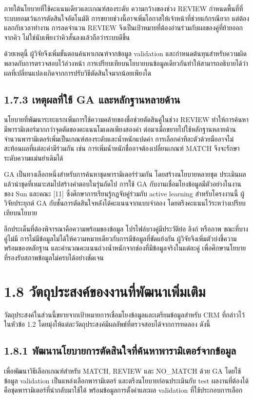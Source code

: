 ภายใต้นโยบายที่ใช้คะแนนเดียวและเกณฑ์สองระดับ ความกว้างของช่วง REVIEW กำหนดพื้นที่ที่ระบบยอมเว้นการตัดสินใจอัตโนมัติ การขยายช่วงนี้อาจเพิ่มโอกาสให้เจ้าหน้าที่ช่วยแก้กรณียาก แต่ต้องแลกกับเวลาทำงาน การลดจำนวน REVIEW จึงเป็นเป้าหมายที่ต้องอ่านร่วมกับผลของคู่ที่ย้ายออกจากคิว ไม่ใช่นับเพียงว่าคิวสั้นลงแล้วถือว่าระบบดีขึ้น

ด้วยเหตุนี้ ผู้วิจัยจึงเพิ่มขั้นตอนค้นหาเกณฑ์จากข้อมูล validation และกำหนดต้นทุนสำหรับความผิดพลาดกับการตรวจสอบไว้ล่วงหน้า การเปรียบเทียบนโยบายบนข้อมูลเดียวกันทำให้สามารถอธิบายได้ว่าผลที่เปลี่ยนแปลงเกิดจากการปรับวิธีตัดสินใจมากน้อยเพียงใด

\subsection*{1.7.3 เหตุผลที่ใช้ GA และหลักฐานหลายด้าน}
นโยบายที่พัฒนาระยะแรกเพิ่มการใช้ความคล้ายของชื่อช่วยตัดสินคู่ในช่วง REVIEW ทำให้การค้นหามีพารามิเตอร์มากกว่าจุดตัดของคะแนนโมเดลเพียงสองค่า ต่อมาเมื่อขยายไปใช้หลักฐานหลายด้าน จำนวนพารามิเตอร์เพิ่มเป็นเกณฑ์สองระดับและน้ำหนักแปดค่า การเลือกค่าทีละตัวด้วยมืออาจไม่สะท้อนผลที่แต่ละค่ามีร่วมกัน เช่น การเพิ่มน้ำหนักชื่ออาจต้องเปลี่ยนเกณฑ์ MATCH จึงจะรักษาระดับความแม่นยำเดิมได้

GA เป็นทางเลือกหนึ่งสำหรับการค้นหาชุดพารามิเตอร์ร่วมกัน โดยสร้างนโยบายหลายชุด ประเมินผล แล้วนำชุดที่เหมาะสมไปสร้างคำตอบในรุ่นถัดไป การใช้ GA กับงานเชื่อมโยงข้อมูลมีตัวอย่างในงานของ Sun และคณะ [11] ซึ่งศึกษาการเรียนรู้กฎจับคู่ร่วมกับ active learning สำหรับโครงงานนี้ ผู้วิจัยประยุกต์ GA กับชั้นการตัดสินใจหลังได้คะแนนจากแบบจำลอง โดยตรึงคะแนนไว้ระหว่างเปรียบเทียบนโยบาย

อีกประเด็นที่ต้องพิจารณาคือความพร้อมของข้อมูล โปรไฟล์บางคู่มีประวัติย่อ ลิงก์ หรือภาพ ขณะที่บางคู่ไม่มี การไม่มีข้อมูลไม่ได้ให้ความหมายเดียวกับการมีข้อมูลที่ขัดแย้งกัน ผู้วิจัยจึงเพิ่มตัวบ่งชี้ความพร้อมของหลักฐาน และคำนวณคะแนนถ่วงน้ำหนักจากช่องที่มีข้อมูลจริงในแต่ละคู่ เพื่อศึกษานโยบายที่รองรับสภาพข้อมูลไม่ครบได้อย่างชัดเจน

\section*{1.8 วัตถุประสงค์ของงานที่พัฒนาเพิ่มเติม}
วัตถุประสงค์ในส่วนนี้ขยายจากเป้าหมายการเชื่อมโยงข้อมูลและเตรียมข้อมูลสำหรับ CRM ที่กล่าวไว้ในหัวข้อ 1.2 โดยมุ่งให้แต่ละวัตถุประสงค์มีผลลัพธ์ที่ตรวจสอบได้จากการทดลอง ดังนี้

\subsection*{1.8.1 พัฒนานโยบายการตัดสินใจที่ค้นหาพารามิเตอร์จากข้อมูล}
เพื่อพัฒนาวิธีเลือกเกณฑ์สำหรับ MATCH, REVIEW และ NO\_MATCH ด้วย GA โดยใช้ข้อมูล validation เป็นแหล่งเลือกพารามิเตอร์ และตรึงนโยบายก่อนประเมินกับ test ผลงานที่ต้องได้คือชุดพารามิเตอร์ที่นำกลับมาใช้ได้ พร้อมข้อมูลการตั้งค่าและผล validation ที่ใช้ประกอบการเลือก

